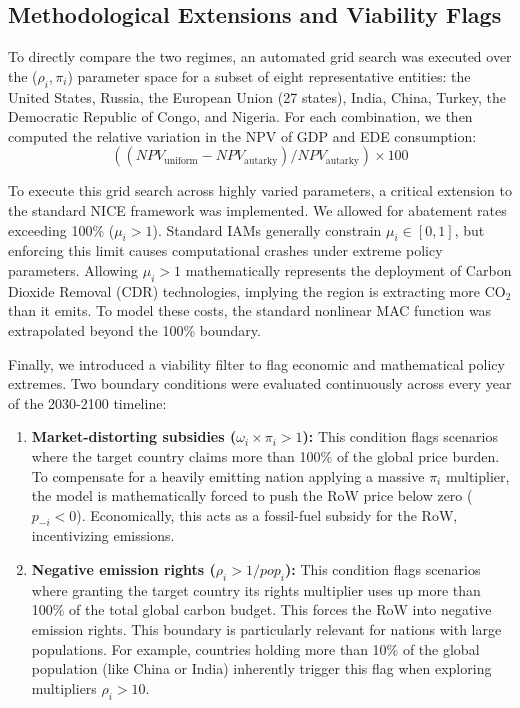 \documentclass[12pt,english]{article}
\begin{document}
\subsection{Methodological Extensions and Viability Flags}

To directly compare the two regimes, an automated grid search was executed over the ($\rho_i, \pi_i$) parameter space for a subset of eight representative entities: the United States, Russia, the European Union (27 states), India, China, Turkey, the Democratic Republic of Congo, and Nigeria. For each combination, we then computed the relative variation in the NPV of GDP and EDE consumption: 
\begin{equation}
    ((NPV_{\text{uniform}}-NPV_{\text{autarky}})/NPV_{\text{autarky}})\times 100
    \label{eq:npv_formula}
\end{equation}

To execute this grid search across highly varied parameters, a critical extension to the standard NICE framework was implemented. We allowed for abatement rates exceeding 100\% ($\mu_i > 1$). Standard IAMs generally constrain $\mu_i \in [0,1]$, but enforcing this limit causes computational crashes under extreme policy parameters. Allowing $\mu_i > 1$ mathematically represents the deployment of Carbon Dioxide Removal (CDR) technologies, implying the region is extracting more CO$_2$ than it emits. To model these costs, the standard nonlinear MAC function was extrapolated beyond the 100\% boundary.


Finally, we introduced a viability filter to flag economic and mathematical policy extremes. Two boundary conditions were evaluated continuously across every year of the 2030-2100 timeline:

\begin{enumerate}
    \item \textbf{Market-distorting subsidies ($\omega_i \times \pi_i > 1$):} This condition flags scenarios where the target country claims more than 100\% of the global price burden. To compensate for a heavily emitting nation applying a massive $\pi_i$ multiplier, the model is mathematically forced to push the RoW price below zero ($p_{-i} < 0$). Economically, this acts as a fossil-fuel subsidy for the RoW, incentivizing emissions.
    \item \textbf{Negative emission rights ($\rho_i > 1/pop_i$):} This condition flags scenarios where granting the target country its rights multiplier uses up more than 100\% of the total global carbon budget. This forces the RoW into negative emission rights. This boundary is particularly relevant for nations with large populations. For example, countries holding more than 10\% of the global population (like China or India) inherently trigger this flag when exploring multipliers $\rho_i > 10$.
\end{enumerate}
\end{document}
